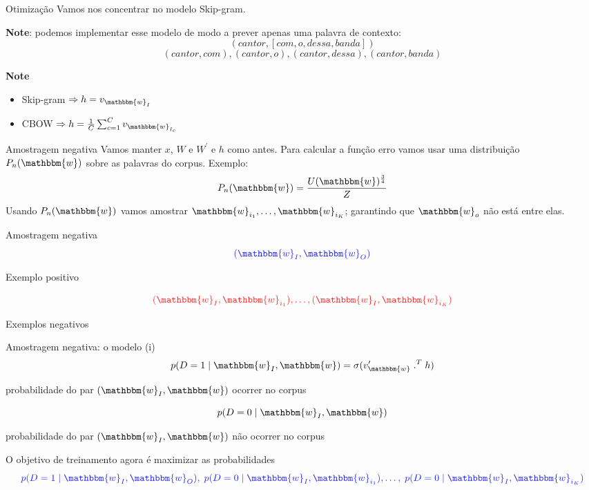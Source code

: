 \documentclass{beamer}
\newcommand{\wo}{\mathbbm{w}}
\begin{document}
\begin{frame}[fragile]{Otimização}
Vamos nos concentrar no modelo Skip-gram. 

\vspace{0.2cm}

\textbf{Note}: podemos implementar esse modelo de modo a prever apenas uma palavra de contexto:\\

\[
(cantor, [com, o, dessa, banda])
\]
\[
(cantor,com), (cantor,o), (cantor,dessa), (cantor,banda)
\]

\textbf{Note}
\begin{itemize}
\item Skip-gram $\Rightarrow h = v_{\wo_I}$ 
\vspace{0.1cm}
\item CBOW $\Rightarrow h = \frac{1}{C}\sum_{c=1}^{C}v_{\wo_{I_{c}}}$ 
\end{itemize}

\end{frame}



\begin{frame}[fragile]{Amostragem negativa}
Vamos manter $x$, $W$ e $W^{\prime}$ e $h$ como antes. Para calcular a função erro vamos usar uma distribuição $P_{n}(\wo)$ sobre as palavras do corpus. Exemplo:\\
\[
P_{n}(\wo) = \frac{U(\wo)^{\frac{3}{4}}}{Z}
\]
\vspace{0.1cm}
Usando $P_{n}(\wo)$ vamos amostrar $\wo_{i_{1}}, \dots , \wo_{i_{K}}$; garantindo que $\wo_{o}$ não está entre elas. 
\end{frame}
\begin{frame}[fragile]{Amostragem negativa}
\[
{\color{blue!89}(\wo_{I},\wo_{O})}
\]
\begin{center}
{\color{blue!89}Exemplo positivo}
\end{center}

\[
{\color{red!89}(\wo_{I},\wo_{i_{1}}), \dots, (\wo_{I},\wo_{i_{K}})}
\]
\begin{center}
{\color{red!89}Exemplos negativos}
\end{center}


\end{frame}
\begin{frame}[fragile]{Amostragem negativa: o modelo (i)}
\[
p(D=1 \;|\; \wo_I,\wo) = \sigma(v_{\wo}^{\prime} \; .^{T} \;h)
\]
\begin{center}
probabilidade do par $(\wo_{I},\wo)$ ocorrer no corpus 
\end{center}
\[
p(D=0 \;|\; \wo_I,\wo)
\]
\begin{center}
probabilidade do par $(\wo_{I},\wo)$ não ocorrer no corpus 
\end{center}
\vspace{0.3cm}
O objetivo de treinamento agora é maximizar as probabilidades  
\[
{\color{blue!89}p(D=1 \;|\; \wo_I,\wo_{O}),\; p(D=0 \;|\; \wo_I,\wo_{i_{1}}), \dots , \; p(D=0 \;|\; \wo_I,\wo_{i_{K}})}
\]
\end{frame}
\end{document}
